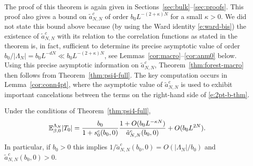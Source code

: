 \documentclass[11pt]{amsart}
\numberwithin{equation}{section}
\numberwithin{theorem}{section}
\newcommand{\1}{{\bf 1}}
\begin{document}
The proof of this theorem is again given in Sections~\ref{sec:bulk}--\ref{sec:proofs}.
This proof also gives a bound on $\tilde a_{N,N}^c$ of order $b_0L^{-(2+\kappa)N}$ for a small $\kappa>0$.
We did not state this bound above because (by using the Ward identity  \eqref{e:ward-bis}) 
the existence of
$\tilde a_{N,N}^c$ with its relation to the correlation functions as stated in the theorem
is, in fact, sufficient to determine its precise asymptotic value of order $b_0/|\Lambda_N| = b_0L^{-dN} \ll b_0L^{-(2+\kappa)N}$,
see Lemmas~\ref{cor:macro}--\ref{cor:anm0} below.
Using this precise asymptotic information on $\tilde a_{N,N}^c$,
Theorem~\ref{thm:forest-macro} then follows from Theorem~\ref{thm:psi4-full}.
The key computation occurs in Lemma~\ref{cor:conn4pt}, where the asymptotic value of $\tilde a_{N,N}^c$
is used to exhibit important cancelations between the
terms on the right-hand side of \eqref{e:2pt-b-thm}.

\begin{lemma}
  \label{cor:macro}
  Under the conditions of Theorem~\ref{thm:psi4-full},
  \begin{equation}
  \label{E:t_0}
    \mathbb{E}^{\Lambda_{N}}_{\beta,0}|T_0|
    =
    \frac{b_0}{1+s_0^c(b_0,0)} \frac{1+O(b_0L^{-\kappa N})}{\tilde a_{N,N}^{c}(b_{0},0)} + O(b_0L^{2N})
    .
  \end{equation}
  In particular, if $b_0>0$ this implies $1/\tilde a_{N,N}^{c}(b_{0},0) = O(|\Lambda_{N}|/b_{0})$
  and $\tilde a_{N,N}^{c}(b_{0},0)>0$.
\end{lemma}
\end{document}
